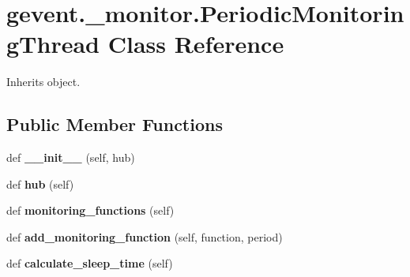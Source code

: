 \hypertarget{classgevent_1_1__monitor_1_1_periodic_monitoring_thread}{}\section{gevent.\+\_\+monitor.\+Periodic\+Monitoring\+Thread Class Reference}
\label{classgevent_1_1__monitor_1_1_periodic_monitoring_thread}


Inherits object.

\subsection*{Public Member Functions}
\begin{DoxyCompactItemize}
\item 
\mbox{\label{classgevent_1_1__monitor_1_1_periodic_monitoring_thread_aa4ebde3b3511a09eea4687c9773b8344}} 
def {\bfseries \+\_\+\+\_\+init\+\_\+\+\_\+} (self, hub)
\item 
\mbox{\label{classgevent_1_1__monitor_1_1_periodic_monitoring_thread_a150a3f2318fc39c95a01ea748556c5ee}} 
def {\bfseries hub} (self)
\item 
\mbox{\label{classgevent_1_1__monitor_1_1_periodic_monitoring_thread_a2493833cbc4bd3c9e352d7fda5dedd24}} 
def {\bfseries monitoring\+\_\+functions} (self)
\item 
\mbox{\label{classgevent_1_1__monitor_1_1_periodic_monitoring_thread_a5d506509f1452a1e35939624cebdf031}} 
def {\bfseries add\+\_\+monitoring\+\_\+function} (self, function, period)
\item 
\mbox{\label{classgevent_1_1__monitor_1_1_periodic_monitoring_thread_ae9939af08a86bdee2f18e3f6b5adc4ba}} 
def {\bfseries calculate\+\_\+sleep\+\_\+time} (self)
\item 
\mbox{\label{classgevent_1_1__monitor_1_1_periodic_monitoring_thread_ae8da9cabead363bfda0ec26df8c03554}} 

\end{DoxyCompactItemize}
